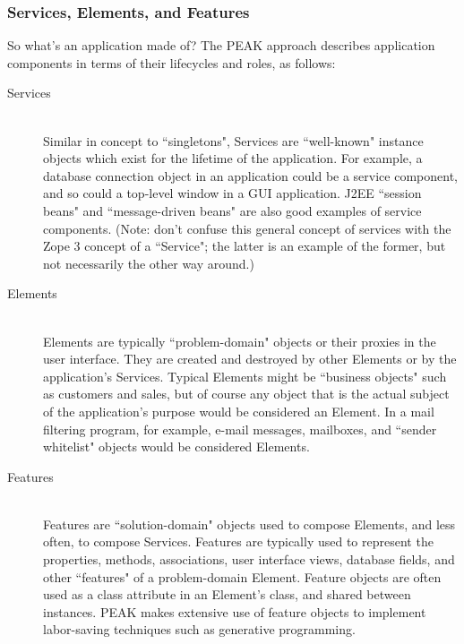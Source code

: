 \vfill






\subsubsection{Services, Elements, and Features}

So what's an application made of?  The PEAK approach describes application
components in terms of their lifecycles and roles, as follows:

\begin{description}
\item[Services] \hfill \\
Similar in concept to ``singletons", Services are ``well-known" instance objects
which exist for the lifetime of the application.  For example, a database
connection object in an application could be a service component, and so could
a top-level window in a GUI application.  J2EE ``session beans" and
``message-driven beans" are also good examples of service components.  (Note:
don't confuse this general concept of services with the Zope 3 concept of a
``Service"; the latter is an example of the former, but not necessarily the
other way around.)

\item[Elements] \hfill \\
Elements are typically ``problem-domain" objects or their proxies in
the user interface.  They are created and destroyed by other Elements or
by the application's Services.  Typical Elements might be ``business objects"
such as customers and sales, but of course any object that is the actual
subject of the application's purpose would be considered an Element.  In a
mail filtering program, for example, e-mail messages, mailboxes, and
``sender whitelist" objects would be considered Elements.

\item[Features] \hfill \\
Features are ``solution-domain" objects used to compose Elements, and less
often, to compose Services.  Features are typically used to represent
the properties, methods, associations, user interface views, database fields,
and other ``features" of a problem-domain Element.  Feature objects are often
used as a class attribute in an Element's class, and shared between instances.
PEAK makes extensive use of feature objects to implement labor-saving
techniques such as generative programming.

\end{description}

